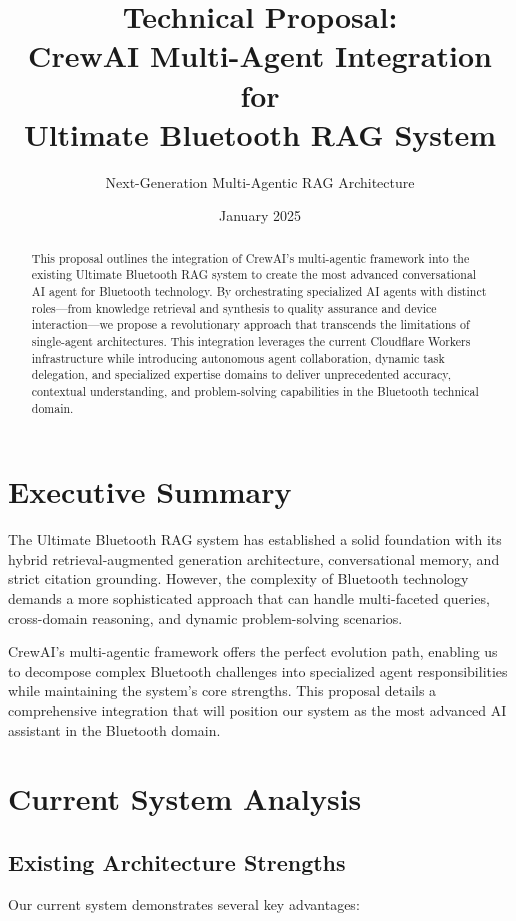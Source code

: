 \documentclass[11pt, a4paper]{article}
\title{\textbf{Technical Proposal: \\ CrewAI Multi-Agent Integration for \\ Ultimate Bluetooth RAG System}}
\author{Next-Generation Multi-Agentic RAG Architecture}
\date{January 2025}
\begin{document}
\maketitle

\begin{abstract}
\noindent This proposal outlines the integration of CrewAI's multi-agentic framework into the existing Ultimate Bluetooth RAG system to create the most advanced conversational AI agent for Bluetooth technology. By orchestrating specialized AI agents with distinct roles—from knowledge retrieval and synthesis to quality assurance and device interaction—we propose a revolutionary approach that transcends the limitations of single-agent architectures. This integration leverages the current Cloudflare Workers infrastructure while introducing autonomous agent collaboration, dynamic task delegation, and specialized expertise domains to deliver unprecedented accuracy, contextual understanding, and problem-solving capabilities in the Bluetooth technical domain.
\end{abstract}

\tableofcontents
\newpage

\section{Executive Summary}

The Ultimate Bluetooth RAG system has established a solid foundation with its hybrid retrieval-augmented generation architecture, conversational memory, and strict citation grounding. However, the complexity of Bluetooth technology demands a more sophisticated approach that can handle multi-faceted queries, cross-domain reasoning, and dynamic problem-solving scenarios.

CrewAI's multi-agentic framework offers the perfect evolution path, enabling us to decompose complex Bluetooth challenges into specialized agent responsibilities while maintaining the system's core strengths. This proposal details a comprehensive integration that will position our system as the most advanced AI assistant in the Bluetooth domain.

\section{Current System Analysis}

\subsection{Existing Architecture Strengths}
Our current system demonstrates several key advantages:
\end{document}
